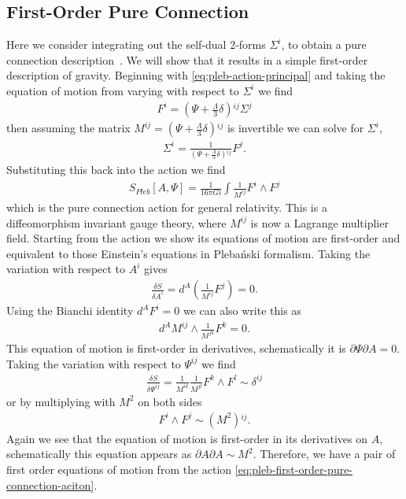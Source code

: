 \documentclass[10pt]{report}
\newcommand{\pleb}[0]{Pleba\'nski}
\theoremstyle{definition}
\begin{document}
\subsection{First-Order Pure Connection}
Here we consider integrating out the self-dual 2-forms $\Sigma^i$, to obtain a pure connection description~\cite{General_relativ_Capovi_1989,Pure_Connection_Krasno_2011}.  We will show that it results in a simple first-order description of gravity. Beginning with \cref{eq:pleb-action-principal} and taking the equation of motion from varying with respect to $\Sigma^i$ we find
\begin{align}
    F^i = (\Psi + \frac{\Lambda}{3} \delta){}^{ij} \Sigma^j
\end{align}
then assuming the matrix $M^{ij} = (\Psi + \frac{\Lambda}{3} \delta){}^{ij}$ is invertible we can solve for $\Sigma^i$,
\begin{align}
    \Sigma^i = \frac{1}{(\Psi + \frac{\Lambda}{3} \delta){}^{ij}} F^j.
\end{align}
Substituting this back into the action we find 
\begin{align}
    S_{Pleb}[A,\Psi] = \frac{1}{16\pi G i} \int \frac{1}{M^{ij}} F^i \wedge F^j \label{eq:pleb-first-order-pure-connection-aciton}
\end{align}
which is the pure connection action for general relativity. This is a diffeomorphism invariant gauge theory, where $M^{ij}$ is now a Lagrange multiplier field. Starting from the action we show its equations of motion are first-order and equivalent to those Einstein's equations in \pleb{} formalism. Taking the variation with respect to $A^i$ gives 
\begin{align}
    \frac{\delta S}{\delta A^i} = d^A \left(  \frac{1}{M^{ij}} F^j \right) = 0.
\end{align}
Using the Bianchi identity $d^A F^i = 0$ we can also write this as 
\begin{align}
    d^A M^{ij} \wedge \frac{1}{M^{jk}} F^k = 0.
\end{align}
This equation of motion is first-order in derivatives, schematically it is $\partial \Psi \partial A = 0$. Taking the variation with respect to $\Psi^{ij}$ we find 
\begin{align}
    \frac{\delta S}{\delta \Psi^{ij}} = \frac{1}{M^{ik}} \frac{1}{M^{jl}} F^k \wedge F^l \sim \delta^{ij}
\end{align}
or by multiplying with $M^2$ on both sides 
\begin{align}
    F^i \wedge F^j \sim \left(M^2\right){}^{ij}. \label{eq:pure-connection-F-F-M2-condition}
\end{align}
Again we see that the equation of motion is first-order in its derivatives on $A$, schematically this equation appears as $\partial A \partial A \sim M^2$. Therefore, we have a pair of first order equations of motion from the action \cref{eq:pleb-first-order-pure-connection-aciton}. 
\end{document}
